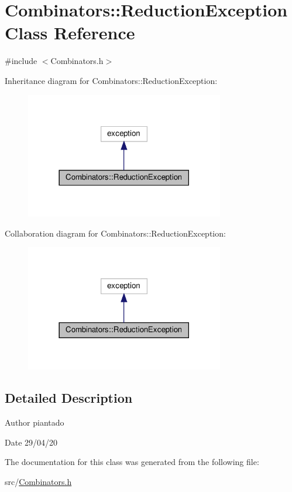 \hypertarget{class_combinators_1_1_reduction_exception}{}\section{Combinators\+:\+:Reduction\+Exception Class Reference}
\label{class_combinators_1_1_reduction_exception}


{\ttfamily \#include $<$Combinators.\+h$>$}



Inheritance diagram for Combinators\+:\+:Reduction\+Exception\+:
\nopagebreak
\begin{figure}[H]
\begin{center}
\leavevmode
\includegraphics[width=246pt]{class_combinators_1_1_reduction_exception__inherit__graph}
\end{center}
\end{figure}


Collaboration diagram for Combinators\+:\+:Reduction\+Exception\+:
\nopagebreak
\begin{figure}[H]
\begin{center}
\leavevmode
\includegraphics[width=246pt]{class_combinators_1_1_reduction_exception__coll__graph}
\end{center}
\end{figure}


\subsection{Detailed Description}
\begin{DoxyAuthor}{Author}
piantado 
\end{DoxyAuthor}
\begin{DoxyDate}{Date}
29/04/20 
\end{DoxyDate}


The documentation for this class was generated from the following file\+:\begin{DoxyCompactItemize}
\item 
src/\hyperlink{_combinators_8h}{Combinators.\+h}\end{DoxyCompactItemize}

